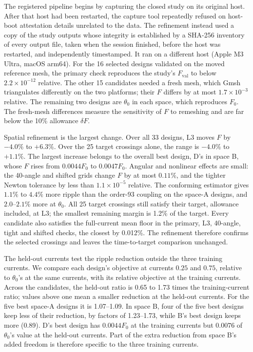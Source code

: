 The registered pipeline begins by capturing the closed study on its
original host. After that host had been restarted, the capture tool
repeatedly refused on host-boot attestation details unrelated to the
data. The refinement instead used a copy of the study outputs whose
integrity is established by a SHA-256 inventory of every output file, taken
when the session finished, before the host was restarted, and
independently timestamped. It ran on a different host (Apple M3 Ultra,
macOS arm64). For the 16 selected designs validated on the moved reference
mesh, the primary check reproduces the study's $F_{\mathrm{val}}$ to below
$2.2\times10^{-12}$ relative. The other 15 candidates needed a fresh mesh,
which Gmsh triangulates differently on the two platforms; their $F$
differs by at most $1.7\times10^{-3}$ relative. The remaining two designs
are $\theta_0$ in each space, which reproduces $F_0$. The fresh-mesh
differences measure the sensitivity of $F$ to remeshing and are far below
the 10\% allowance $\delta F$.

Spatial refinement is the largest change. Over all 33 designs, L3 moves
$F$ by $-4.0\%$ to $+6.3\%$. Over the 25 target crossings alone, the range
is $-4.0\%$ to $+1.1\%$. The largest increase belongs to the overall best
design, D's in space B, whose $F$ rises from $0.0044F_0$ to $0.0047F_0$.
Angular and nonlinear effects are small: the 40-angle and shifted grids
change $F$ by at most $0.11\%$, and the tighter Newton tolerance by less
than $1.1\times10^{-5}$ relative. The conforming estimator gives $1.1\%$ to
$4.4\%$ more ripple than the order-93 coupling on the space-A designs, and
$2.0$--$2.1\%$ more at $\theta_0$. All 25 target crossings still satisfy
their target, allowance included, at L3; the smallest remaining margin is
1.2\% of the target. Every candidate also satisfies the full-current mean
floor in the primary, L3, 40-angle, tight and shifted checks, the closest
by 0.012\%. The refinement therefore confirms the selected crossings and
leaves the time-to-target comparison unchanged.

The held-out currents test the ripple reduction outside the three training
currents. We compare each design's objective at currents $0.25$ and $0.75$,
relative to $\theta_0$'s at the same currents, with its relative objective
at the training currents. Across the candidates, the held-out ratio is 0.65
to 1.73 times the training-current ratio; values above one mean a smaller
reduction at the held-out currents. For the five best space-A designs it
is 1.07--1.09. In space B, four of the five best designs keep less of
their reduction, by factors of 1.23--1.73, while B's best design keeps more
(0.89). D's best design has $0.0044F_0$ at the training currents but
$0.0076$ of $\theta_0$'s value at the held-out currents. Part of the extra
reduction from space B's added freedom is therefore specific to the three
training currents.

